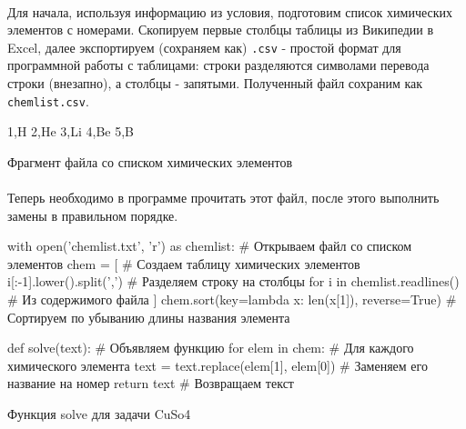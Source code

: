 \documentclass[12pt]{article}
\begin{document}
    \paragraph{}
    Для начала, используя информацию из условия, подготовим список химических элементов с номерами.
    Скопируем первые столбцы таблицы из Википедии в Excel, далее экспортируем (сохраняем как) \verb|.csv| -
    простой формат для программной работы с таблицами: строки разделяются символами перевода строки (внезапно),
    а столбцы - запятыми.
    Полученный файл сохраним как \verb|chemlist.csv|.
    \begin{listing}[H]
        \begin{pythoncode}
1,H
2,He
3,Li
4,Be
5,B
        \end{pythoncode}
        \caption{Фрагмент файла со списком химических элементов}
        \label{lst:chemlist}
    \end{listing}

    \paragraph{}
    Теперь необходимо в программе прочитать этот файл, после этого выполнить замены в правильном порядке.
    \begin{listing}[H]
        \begin{pythoncode}
with open('chemlist.txt', 'r') as chemlist:      # Открываем файл со списком элементов
    chem = [                                     # Создаем таблицу химических элементов
        i[:-1].lower().split(',')                # Разделяем строку на столбцы
        for i in chemlist.readlines()            # Из содержимого файла
    ]
chem.sort(key=lambda x: len(x[1]), reverse=True) # Сортируем по убыванию длины названия элемента

def solve(text):                                 # Объявляем функцию
    for elem in chem:                            # Для каждого химического элемента
        text = text.replace(elem[1], elem[0])    # Заменяем его название на номер
    return text                                  # Возвращаем текст
        \end{pythoncode}
        \caption{Функция solve для задачи CuSo4}
        \label{lst:solve23}
    \end{listing}
\end{document}
